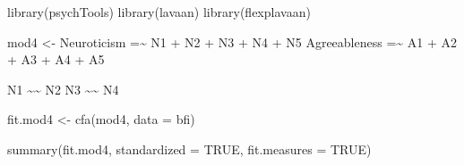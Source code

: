 \documentclass[
  letterpaper,
  DIV=11,
  numbers=noendperiod]{scrreprt}
\newenvironment{Shaded}{\begin{snugshade}}{\end{snugshade}}
\newcommand{\AttributeTok}[1]{\textcolor[rgb]{0.40,0.45,0.13}{#1}}
\newcommand{\ConstantTok}[1]{\textcolor[rgb]{0.56,0.35,0.01}{#1}}
\newcommand{\FunctionTok}[1]{\textcolor[rgb]{0.28,0.35,0.67}{#1}}
\newcommand{\NormalTok}[1]{\textcolor[rgb]{0.00,0.23,0.31}{#1}}
\newcommand{\OtherTok}[1]{\textcolor[rgb]{0.00,0.23,0.31}{#1}}
\newcommand{\StringTok}[1]{\textcolor[rgb]{0.13,0.47,0.30}{#1}}
\begin{document}
\begin{Shaded}
\begin{Highlighting}[]
\FunctionTok{library}\NormalTok{(psychTools)}
\FunctionTok{library}\NormalTok{(lavaan)}
\FunctionTok{library}\NormalTok{(flexplavaan)}

\NormalTok{mod4 }\OtherTok{\textless{}{-}} \StringTok{\textquotesingle{}}
\StringTok{Neuroticism   =\textasciitilde{} N1 + N2 + N3 + N4 + N5}
\StringTok{Agreeableness =\textasciitilde{} A1 + A2 + A3 + A4 + A5}

\StringTok{N1 \textasciitilde{}\textasciitilde{} N2}
\StringTok{N3 \textasciitilde{}\textasciitilde{} N4}
\StringTok{\textquotesingle{}}

\NormalTok{fit.mod4 }\OtherTok{\textless{}{-}} \FunctionTok{cfa}\NormalTok{(mod4, }
                \AttributeTok{data =}\NormalTok{ bfi)}

\FunctionTok{summary}\NormalTok{(fit.mod4, }
        \AttributeTok{standardized =} \ConstantTok{TRUE}\NormalTok{, }
        \AttributeTok{fit.measures =} \ConstantTok{TRUE}\NormalTok{)}
\end{Highlighting}
\end{Shaded}
\end{document}
